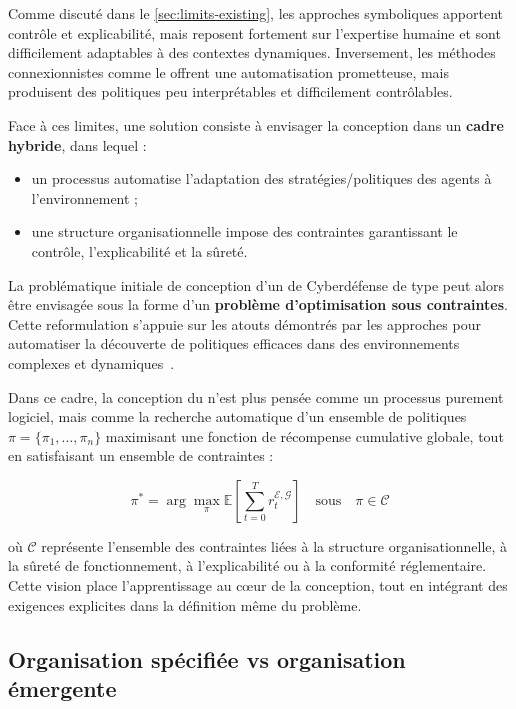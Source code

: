 Comme discuté dans le \autoref{sec:limits-existing}, les approches symboliques apportent contrôle et explicabilité, mais reposent fortement sur l'expertise humaine et sont difficilement adaptables à des contextes dynamiques. Inversement, les méthodes connexionnistes comme le  offrent une automatisation prometteuse, mais produisent des politiques peu interprétables et difficilement contrôlables.

Face à ces limites, une solution consiste à envisager la conception  dans un \textbf{cadre hybride}, dans lequel :
\begin{itemize}
    \item un processus  automatise l'adaptation des stratégies/politiques des agents à l'environnement ;
    \item une structure organisationnelle impose des contraintes garantissant le contrôle, l'explicabilité et la sûreté.
\end{itemize}

La problématique initiale de conception d'un  de Cyberdéfense de type  peut alors être envisagée sous la forme d'un \textbf{problème d'optimisation sous contraintes}. Cette reformulation s'appuie sur les atouts démontrés par les approches  pour automatiser la découverte de politiques efficaces dans des environnements complexes et dynamiques~\cite{Zhang2021, Papoudakis2021}.

Dans ce cadre, la conception du  n'est plus pensée comme un processus purement logiciel, mais comme la recherche automatique d'un ensemble de politiques \(\pi = \{\pi_1, \dots, \pi_n\}\) maximisant une fonction de récompense cumulative globale, tout en satisfaisant un ensemble de contraintes :

\begin{equation}
    \pi^* = \arg\max_{\pi} \mathbb{E}\left[\sum_{t=0}^{T} r^{\mathcal{E},\mathcal{G}}_t\right] \quad \text{sous} \quad \pi \in \mathcal{C}
\end{equation}

où \(\mathcal{C}\) représente l'ensemble des contraintes liées à la structure organisationnelle, à la sûreté de fonctionnement, à l'explicabilité ou à la conformité réglementaire. Cette vision place l'apprentissage au cœur de la conception, tout en intégrant des exigences explicites dans la définition même du problème.


\subsection*{Organisation spécifiée vs organisation émergente}

